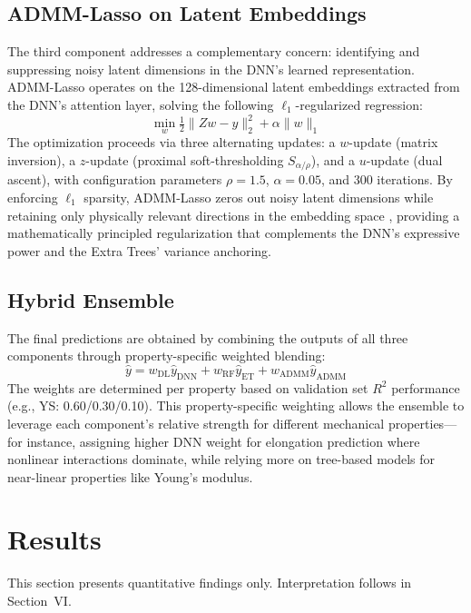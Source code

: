 \documentclass[conference]{IEEEtran}
\begin{document}
\subsection{ADMM-Lasso on Latent Embeddings}
The third component addresses a complementary concern: identifying and suppressing noisy latent dimensions in the DNN's learned representation. ADMM-Lasso operates on the 128-dimensional latent embeddings extracted from the DNN's attention layer, solving the following $\ell_1$-regularized regression:
\begin{equation}
\min_w \tfrac{1}{2}\|Zw - y\|_2^2 + \alpha\|w\|_1
\end{equation}
The optimization proceeds via three alternating updates: a $w$-update (matrix inversion), a $z$-update (proximal soft-thresholding $S_{\alpha/\rho}$), and a $u$-update (dual ascent), with configuration parameters $\rho=1.5$, $\alpha=0.05$, and 300 iterations. By enforcing $\ell_1$ sparsity, ADMM-Lasso zeros out noisy latent dimensions while retaining only physically relevant directions in the embedding space \cite{b2}, providing a mathematically principled regularization that complements the DNN's expressive power and the Extra Trees' variance anchoring.

\subsection{Hybrid Ensemble}
The final predictions are obtained by combining the outputs of all three components through property-specific weighted blending:
\begin{equation}
\hat{y} = w_{\text{DL}}\hat{y}_{\text{DNN}} + w_{\text{RF}}\hat{y}_{\text{ET}} + w_{\text{ADMM}}\hat{y}_{\text{ADMM}}
\end{equation}
The weights are determined per property based on validation set $R^2$ performance (e.g., YS: 0.60/0.30/0.10). This property-specific weighting allows the ensemble to leverage each component's relative strength for different mechanical properties---for instance, assigning higher DNN weight for elongation prediction where nonlinear interactions dominate, while relying more on tree-based models for near-linear properties like Young's modulus.

\section{Results}

This section presents quantitative findings only. Interpretation follows in Section~VI.
\end{document}

